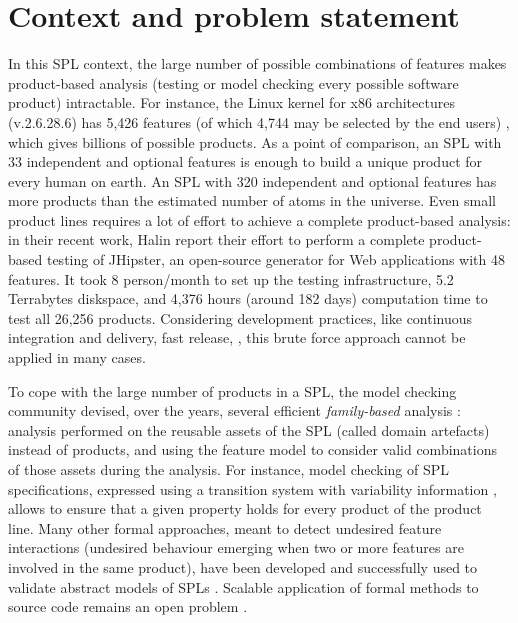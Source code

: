 \section{Context and problem statement}

In this \gls{SPL} context, the large number of possible combinations of features makes product-based analysis (\ie testing or model checking every possible software product) intractable. 
For instance, the Linux kernel for x86 architectures (v.2.6.28.6) has 5,426 features (of which 4,744 may be selected by the end users) \cite{She2011,Apel2013}, which gives billions of possible products. 
As a point of comparison, an \gls{SPL} with 33 independent and optional features is enough to build a unique product for every human on earth. An SPL with 320 independent and optional features has more products than the estimated number of atoms in the universe. 
Even small product lines requires a lot of effort to achieve a complete product-based analysis: in their recent work, Halin \etal \cite{Halin2017,Halin2017b} report their effort to perform a complete product-based testing of JHipster, an open-source generator for Web applications with 48 features. It took 8 person/month to set up the testing infrastructure, 5.2 Terrabytes diskspace, and 4,376 hours (around 182 days) computation time to test all 26,256 products. 
Considering development practices, like continuous integration and delivery, fast release, \etc, this brute force approach cannot be applied in many cases. 

To cope with the large number of products in a SPL, the model checking community devised, over the years, several efficient \emph{family-based} analysis \cite{Thum2014}: \ie analysis performed on the reusable assets of the SPL (called domain artefacts) instead of products, and using the \gls{feature model} to consider valid combinations of those assets during the analysis. For instance, model checking of SPL specifications, expressed using a transition system with variability information \cite{Classen2013b,Fischbein2006}, allows to ensure that a given property holds for every product of the product line. Many other formal approaches, meant to detect undesired feature interactions (\ie undesired behaviour emerging when two or more features are involved in the same product), have been developed \cite{Calder2003,Nhlabatsi2008} and successfully used to validate abstract models of \glspl{SPL} \cite{Heymans2012,Shaker2014b,Zave1993}. Scalable application of formal methods to source code remains an open problem \cite{Apel2013}.

